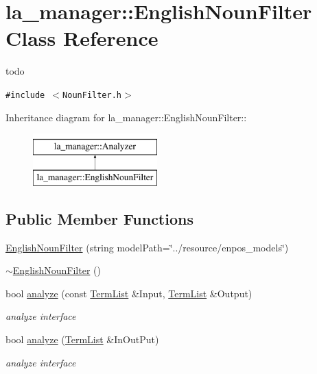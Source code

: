 \hypertarget{classla__manager_1_1EnglishNounFilter}{
\section{la\_\-manager::EnglishNounFilter Class Reference}
\label{classla__manager_1_1EnglishNounFilter}
}
todo  


{\tt \#include $<$NounFilter.h$>$}

Inheritance diagram for la\_\-manager::EnglishNounFilter::\begin{figure}[H]
\begin{center}
\leavevmode
\includegraphics[height=2cm]{classla__manager_1_1EnglishNounFilter}
\end{center}
\end{figure}
\subsection*{Public Member Functions}
\begin{CompactItemize}
\item 
\hyperlink{classla__manager_1_1EnglishNounFilter_1ad97483125324eb139981b1c02bbb20}{EnglishNounFilter} (string modelPath=\char`\"{}../resource/enpos\_\-models\char`\"{})
\item 
\hyperlink{classla__manager_1_1EnglishNounFilter_11cbedc0463e0616bdcb1e7168a5d2bd}{$\sim$EnglishNounFilter} ()
\item 
bool \hyperlink{classla__manager_1_1EnglishNounFilter_8d45f1cdea331de42838fcf89de9c576}{analyze} (const \hyperlink{namespacela__manager_06c0aab93982ee3ebc3ef9d0419e619a}{TermList} \&Input, \hyperlink{namespacela__manager_06c0aab93982ee3ebc3ef9d0419e619a}{TermList} \&Output)
\begin{CompactList}\small\item\em analyze interface \item\end{CompactList}\item 
bool \hyperlink{classla__manager_1_1EnglishNounFilter_a74c3ab1bb4af5b8e3f4693e4181c213}{analyze} (\hyperlink{namespacela__manager_06c0aab93982ee3ebc3ef9d0419e619a}{TermList} \&InOutPut)
\begin{CompactList}\small\item\em analyze interface \item\end{CompactList}\end{CompactItemize}
